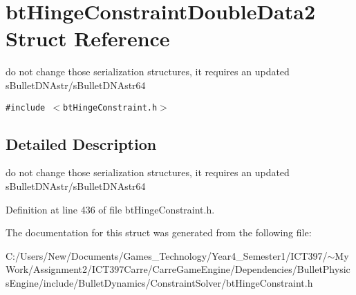 \hypertarget{structbt_hinge_constraint_double_data2}{
\section{btHingeConstraintDoubleData2 Struct Reference}
\label{structbt_hinge_constraint_double_data2}
}
do not change those serialization structures, it requires an updated sBulletDNAstr/sBulletDNAstr64  


{\tt \#include $<$btHingeConstraint.h$>$}



\subsection{Detailed Description}
do not change those serialization structures, it requires an updated sBulletDNAstr/sBulletDNAstr64 

Definition at line 436 of file btHingeConstraint.h.

The documentation for this struct was generated from the following file:\begin{CompactItemize}
\item 
C:/Users/New/Documents/Games\_\-Technology/Year4\_\-Semester1/ICT397/$\sim$My Work/Assignment2/ICT397Carre/CarreGameEngine/Dependencies/BulletPhysicsEngine/include/BulletDynamics/ConstraintSolver/btHingeConstraint.h\end{CompactItemize}
